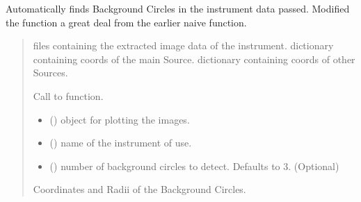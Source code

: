 \documentclass[letterpaper,10pt,english]{sphinxmanual}
\begin{document}
\begin{fulllineitems}
\begin{fulllineitems}
\label{\detokenize{xmmPipeline:xmmPipeline.findOverlap.findOverlap.backgroundCircles_indi}}
\pysigstartsignatures
{}
\pysigstopsignatures
\sphinxAtStartPar
Automatically finds Background Circles in the instrument data passed.
Modified the function a great deal from the earlier naive  function.
\begin{quote}\begin{description}
\sphinxAtStartPar
{} files containing the extracted image data of the instrument.
 dictionary containing coords of the main Source.
 dictionary containing coords of other Sources.

\sphinxAtStartPar
Call to  function.

\begin{itemize}
\item {} 
\sphinxAtStartPar
{} () \textendash{}  object for plotting the images.

\item {} 
\sphinxAtStartPar
{} () \textendash{} name of the instrument of use.

\item {} 
\sphinxAtStartPar
{} () \textendash{} number of background circles to detect. Defaults to 3. (Optional)

\end{itemize}

\sphinxAtStartPar
Coordinates and Radii of the Background Circles.

\end{description}\end{quote}

\end{fulllineitems}
\end{fulllineitems}
\end{document}
